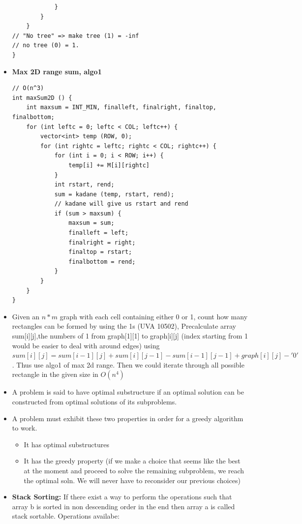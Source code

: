 \documentclass[8pt, a4paper, oneside, twocolumn]{extarticle}
\begin{document}
\begin{itemize}
\begin{verbatim}
            }
        }
    }
// "No tree" => make tree (1) = -inf
// no tree (0) = 1.
}
    \end{verbatim}
    \item \textbf{Max 2D range sum, algo1} 
    \begin{verbatim}
// O(n^3)
int maxSum2D () {
    int maxsum = INT_MIN, finalleft, finalright, finaltop, finalbottom;
    for (int leftc = 0; leftc < COL; leftc++) {
        vector<int> temp (ROW, 0);
        for (int rightc = leftc; rightc < COL; rightc++) {
            for (int i = 0; i < ROW; i++) {
                temp[i] += M[i][rightc]
            }
            int rstart, rend;
            sum = kadane (temp, rstart, rend);
            // kadane will give us rstart and rend
            if (sum > maxsum) {
                maxsum = sum;
                finalleft = left;
                finalright = right;
                finaltop = rstart;
                finalbottom = rend;
            } 
        }
    }
}
    \end{verbatim}
    \item Given an $n*m$ graph with each cell containing either 0 or 1, count how many rectangles can be formed by using the 1s (UVA 10502), Precalculate array sum[i][j],the numbers of 1 from graph[1][1] to graph[i][j] (index starting from 1 would be easier to deal with around edges) using $sum[i][j] = sum[i-1][j]+sum[i][j-1]-sum[i-1][j-1] + graph[i][j]-'0'$. Thus use algo1 of max 2d range.
    Then we could iterate through all possible rectangle in the given size in $O(n^4)$
    \item A problem is said to have optimal substructure if an optimal solution can be constructed from optimal solutions of its subproblems.
    \item A problem must exhibit these two properties in order for a greedy algorithm to work.
    \begin{itemize}
        \item It has optimal substructures
        \item It has the greedy property (if we make a choice that seems like the best at the moment and proceed to solve the remaining subproblem, we reach the optimal soln. We will never have to reconsider our previous choices)
    \end{itemize}
    \item \textbf{Stack Sorting: }If there exist a way to perform the operations such that array b is sorted in non descending order in the end then array a is called stack sortable. Operations availabe:

\end{itemize}
\end{document}
